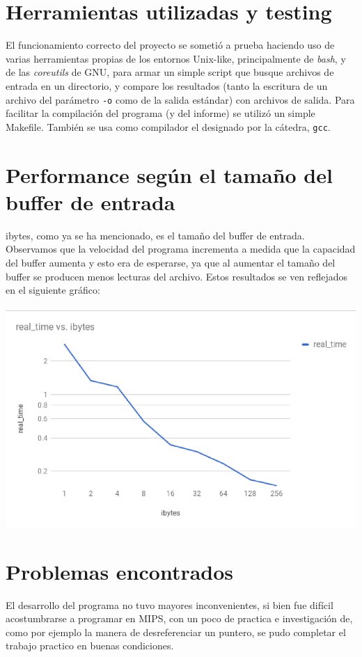 \documentclass[a4paper,10pt]{article}
\begin{document}
    \section{Herramientas utilizadas y testing}
El funcionamiento correcto del proyecto se sometió a prueba haciendo uso de varias herramientas propias de los entornos Unix-like, principalmente de \textit{bash}, y de las \textit{coreutils} de GNU, para armar un simple script que busque archivos de entrada en un directorio, y compare los resultados (tanto la escritura de un archivo del parámetro \texttt{-o} como de la salida estándar) con archivos de salida. Para facilitar la compilación del programa (y del informe) se utilizó un simple Makefile. También se usa como compilador el designado por la cátedra, \texttt{gcc}.
\newpage
    \section{Performance según el tamaño del buffer de entrada}
    ibytes, como ya se ha mencionado, es el tamaño del buffer de entrada. Observamos que la velocidad del programa incrementa a medida que la capacidad del buffer aumenta y esto era de esperarse, ya que al aumentar el tamaño del buffer se producen menos lecturas del archivo. Estos resultados se ven reflejados en el siguiente gráfico:\\\\
    \includegraphics[width=14cm]{plots/times.png}\\
    
    \section{Problemas encontrados}
El desarrollo del programa no tuvo mayores inconvenientes, si bien fue difícil acostumbrarse a programar en MIPS, con un poco de practica e investigación de, como por ejemplo la manera de desreferenciar un puntero, se pudo completar el trabajo practico en buenas condiciones.
\end{document}
